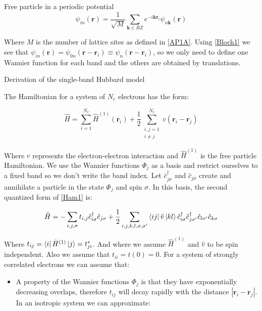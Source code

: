 \begin{section}{Free particle in a periodic potential}
\begin{equation}
\psi_{in}(\textbf{r}) = \frac{1}{\sqrt{M}}\sum_{\textbf{k}\in BZ} e^{-i\textbf{k}\textbf{r}_i} \psi_{n\textbf{k}}(\textbf{r})
\end{equation}

Where $M$ is the number of lattice sites as defined in \ref{AP1A}. Using \ref{Bloch1} we see that $\psi_{in}(\textbf{r}) = \psi_{0n}(\textbf{r}-\textbf{r}_i) \equiv \psi_{n}(\textbf{r}-\textbf{r}_i)$, so we only need to define one Wannier function for each band and the others are obtained by translations. 

\end{section}

\begin{section}{Derivation of the single-band Hubbard model}

The Hamiltonian for a system of $N_e$ electrons has the form:

\begin{equation}
\label{Ham1}
\hat{H} = \sum_{i=1}^{N_e} \hat{H}^{(1)}(\textbf{r}_i) + \frac{1}{2} \sum_{\substack{i,j = 1 \\ i \neq j}} ^ {N_e} v(\textbf{r}_i - \textbf{r}_j)
\end{equation}

Where $v$ represents the electron-electron interaction and $\hat{H}^{(1)}$ is the free particle Hamiltonian. We use the Wannier functions $\Phi_j$ as a basis and restrict ourselves to a fixed band so we don't write the band index. Let $\hat{c}_{j \sigma}^\dagger$ and $\hat{c}_{j \sigma}$ create and annihilate a particle in the state $\Phi_j$ and spin $\sigma$. In this basis, the second quantized form of \ref{Ham1} is:

\begin{equation}
\hat{H} = -\sum_{i,j,\sigma} t_{i,j} \hat{c}_{i \sigma}^\dagger \hat{c}_{j \sigma} + \frac{1}{2} \sum_{i,j,k,l, \sigma, \sigma'} \bra{ij} \hat{v} \ket{kl} \hat{c}_{i \sigma}^\dagger \hat{c}_{j \sigma'}^\dagger \hat{c}_{l \sigma'} \hat{c}_{k \sigma}
\end{equation}

Where $t_{ij} = \bra{i} \hat{H}^{(1)} \ket{j} = t_{ji}^*$. And where we assume $\hat{H}^{(1)}$ and $\hat{v}$ to be spin independent. Also we assume that $t_{ii} = t(0) = 0$. For a system of strongly correlated electrons we can assume that:

\begin{itemize}
\item A property of the Wannier functions $\Phi_j$ is that they have exponentially decreasing overlaps, therefore $t_{ij}$ will decay rapidly with the distance $|\textbf{r}_i-\textbf{r}_j|$. In an isotropic system we can approximate:


\end{itemize}
\end{section}
